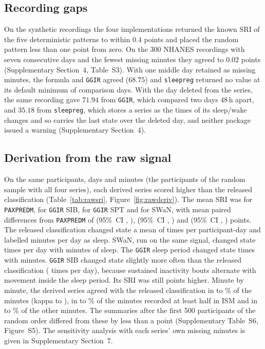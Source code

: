 \documentclass[12pt]{article}
\newcommand{\CI}[2]{(95\%\ CI #1, #2)}
\begin{document}
\subsection{Recording gaps}
\label{sec:gapresults}
On the synthetic recordings the four implementations returned the known SRI of the five deterministic patterns to within $0.4$ points and placed the random pattern less than one point from zero. On the 300 NHANES recordings with seven consecutive days and the fewest missing minutes they agreed to $0.02$ points (Supplementary
Section~4, Table~S3). With one middle
day retained as missing minutes, the formula and \texttt{GGIR} agreed
($68.75$) and \texttt{sleepreg} returned no value at its default minimum of
comparison days. With the day deleted from the series, the same recording gave
$71.94$ from \texttt{GGIR}, which compared two days 48\,h apart, and
$35.18$ from \texttt{sleepreg}, which stores a series as the times of its
sleep/wake changes and so carries the last state over the deleted day, and
neither package issued a warning (Supplementary
Section~4).

\subsection{Derivation from the raw signal}
\label{sec:rawresults}
On the same participants, days and minutes (the \rawNsample{} participants of the random sample with all four series), each derived series scored higher than the released classification (Table~\ref{tab:rawsri}, Figure~\ref{fig:rawderiv}). The mean
SRI was \rawPaxpredmSriMean{} for \texttt{PAXPREDM}, \rawGgirSibSriMean{} for
\texttt{GGIR} SIB, \rawGgirSptSriMean{} for \texttt{GGIR} SPT and
\rawSwanSriMean{} for SWaN, with mean paired differences from
\texttt{PAXPREDM} of \rawGgirSibDiffMean{}
\CI{\rawGgirSibDiffLo}{\rawGgirSibDiffHi}, \rawGgirSptDiffMean{}
\CI{\rawGgirSptDiffLo}{\rawGgirSptDiffHi} and \rawSwanDiffMean{}
\CI{\rawSwanDiffLo}{\rawSwanDiffHi} points. The released classification changed
state a mean of \rawPaxpredmTransDay{} times per participant-day and labelled
\rawPaxpredmSleepMinDay{} minutes per day as sleep. SWaN, run on the same signal, changed state \rawSwanTransDay{} times per day with \rawSwanSleepMinDay{} minutes of sleep. The \texttt{GGIR} sleep period changed state \rawGgirSptTransDay{} times with \rawGgirSptSleepMinDay{} minutes.
\texttt{GGIR} SIB changed state slightly more often than the released
classification (\rawGgirSibTransDay{} times per day), because sustained inactivity bouts alternate with movement inside the sleep period. Its SRI was still \rawGgirSibDiffMean{} points higher. Minute by minute, the derived series
agreed with the released classification in \rawGgirSibAgreeAll{} to
\rawSwanAgreeAll\% of the minutes (kappa \rawGgirSibKappaAll{} to
\rawSwanKappaAll), in \rawGgirSibAgreeIsm{} to \rawSwanAgreeIsm\% of the
minutes recorded at least half in ISM and in \rawGgirSptAgreeNon{} to
\rawGgirSibAgreeNon\% of the other minutes. The summaries after the first 500 participants of the random order differed from these by less than a point (Supplementary Table~S6, Figure~S5). The sensitivity analysis with each series' own missing minutes is given in Supplementary Section~7.
\end{document}
